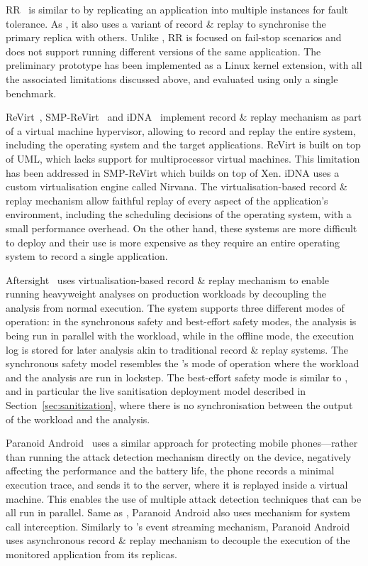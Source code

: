 RR~\cite{rr} is similar to \varan by replicating an application into multiple
instances for fault tolerance. As \varan, it also uses a variant of
record \& replay to synchronise the primary replica with others. Unlike \varan, RR
is focused on fail-stop scenarios and does not support running different
versions of the same application. The preliminary prototype has been
implemented as a Linux kernel extension, with all the associated limitations
discussed above, and evaluated using only a single benchmark.

ReVirt~\cite{revirt}, SMP-ReVirt~\cite{smp-revirt} and iDNA~\cite{idna}
implement record \& replay mechanism as part of a virtual machine hypervisor,
allowing to record and replay the entire system, including the operating system
and the target applications. ReVirt is built on top of UML, which lacks support
for multiprocessor virtual machines. This limitation has been addressed in
SMP-ReVirt which builds on top of Xen. iDNA uses a custom virtualisation engine
called Nirvana. The virtualisation-based record \& replay mechanism allow faithful
replay of every aspect of the application's environment, including the
scheduling decisions of the operating system, with a small performance
overhead.  On the other hand, these systems are more difficult to deploy and
their use is more expensive as they require an entire operating system to
record a single application.

Aftersight~\cite{aftersight} uses virtualisation-based record \& replay
mechanism to enable running heavyweight analyses on production workloads by
decoupling the analysis from normal execution. The system supports three
different modes of operation: in the synchronous safety and best-effort safety
modes, the analysis is being run in parallel with the workload, while in the
offline mode, the execution log is stored for later analysis akin to
traditional record \& replay systems. The synchronous safety model resembles
the \mx's mode of operation where the workload and the analysis are run in
lockstep.  The best-effort safety mode is similar to \varan, and in particular
the live sanitisation deployment model described in
Section~\ref{sec:sanitization}, where there is no synchronisation between the
output of the workload and the analysis.

Paranoid Android~\cite{paranoid-android} uses a similar approach for protecting
mobile phones---rather than running the attack detection mechanism directly on
the device, negatively affecting the performance and the battery life, the
phone records a minimal execution trace, and sends it to the server, where it
is replayed inside a virtual machine. This enables the use of multiple attack
detection techniques that can be all run in parallel. Same as \mx, Paranoid
Android also uses \ptrace mechanism for system call interception.  Similarly to
\varan's event streaming mechanism, Paranoid Android uses asynchronous record
\& replay mechanism to decouple the execution of the monitored application from
its replicas.



